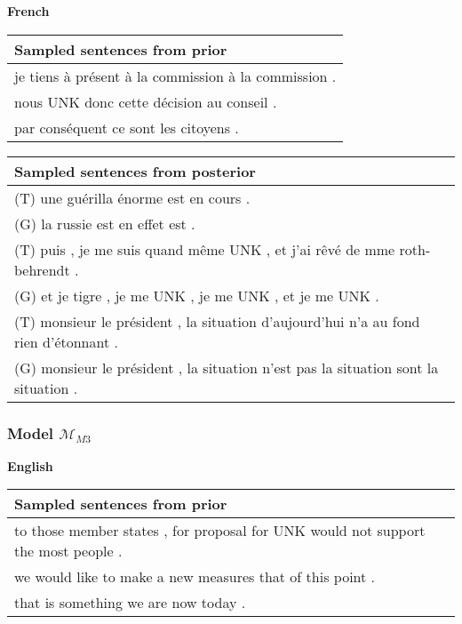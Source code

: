 \textbf{French}

\begin{center}
  \begin{tabular}{|L{14cm}|}
    \hline
    Sampled sentences from prior\\
    \hline\hline
    je tiens à présent à la commission à la commission .\\
    \hline
    nous UNK donc cette décision au conseil .\\
    \hline
    par conséquent ce sont les citoyens .\\
    \hline
  \end{tabular}
\end{center}

\begin{center}
  \begin{tabular}{|L{14cm}|} 
    \hline
    Sampled sentences from posterior\\ [0.5ex] 
    \hline\hline
    (T) une guérilla énorme est en cours .\\
    (G) la russie est en effet est .\\
    \hline
    (T) puis , je me suis quand même UNK , et j'ai rêvé de mme roth-behrendt .\\
    (G) et je tigre , je me UNK , je me UNK , et je me UNK .\\
    \hline
    (T) monsieur le président , la situation d'aujourd'hui n'a au fond rien d'étonnant .\\
    (G) monsieur le président , la situation n'est pas la situation sont la situation .\\
    \hline
  \end{tabular}
\end{center}

\subsubsection{Model $\mathcal{M}_{M3}$}

\textbf{English}

\begin{center}
  \begin{tabular}{|L{14cm}|} 
    \hline
    Sampled sentences from prior\\
    \hline\hline
    to those member states , for proposal for UNK would not support the most people .\\
    \hline
    we would like to make a new measures that of this point .\\
    \hline
    that is something we are now today .\\
    \hline
  \end{tabular}
\end{center}

